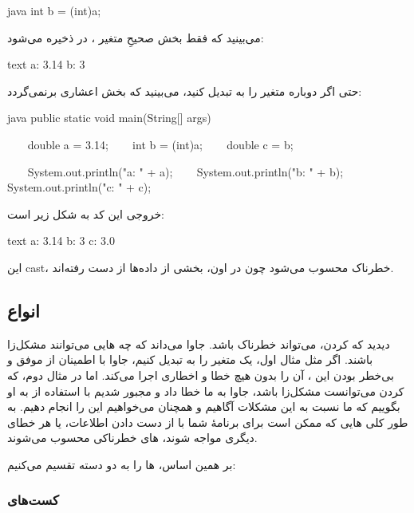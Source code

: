 \begin{codebox}{java}
int b = (int)a;
\end{codebox}

می‌بینید که فقط بخش صحیحِ متغیر ، در  ذخیره
می‌شود:

\begin{codebox}{text}
a: 3.14  
b: 3
\end{codebox}

حتی اگر دوباره متغیر  را به  تبدیل
کنید، می‌بینید که بخش اعشاری‌ برنمی‌گردد:

\begin{codebox}{java}
public static void main(String[] args) {
    double a = 3.14;
    int b = (int)a;
    double c = b;  
  
    System.out.println("a: " + a);  
    System.out.println("b: " + b);  
    System.out.println("c: " + c);  
}
\end{codebox}

خروجی این کد به شکل زیر است:

\begin{codebox}{text}
a: 3.14  
b: 3  
c: 3.0
\end{codebox}

این cast، خطرناک محسوب می‌شود چون در اون، بخشی از داده‌ها از دست رفته‌اند.

\subsection{انواع }

دیدید که  کردن، می‌تواند خطرناک باشد. جاوا می‌داند که چه
 هایی می‌توانند مشکل‌زا باشند. اگر مثل مثال اول، یک متغیر
 را به  تبدیل کنیم، جاوا با اطمینان
از موفق و بی‌خطر بودن این  ، آن را بدون هیچ خطا و اخطاری اجرا
می‌کند. اما در مثال دوم، که  کردن می‌توانست مشکل‌زا باشد، جاوا به
ما خطا داد و مجبور شدیم با استفاده از  به او بگوییم
که ما نسبت به این مشکلات آگاهیم و همچنان می‌خواهیم این  را انجام
دهیم. به طور کلی  هایی که ممکن است برای برنامهٔ شما با از دست
دادن اطلاعات،  یا هر خطای دیگری مواجه شوند،  های
خطرناکی محسوب می‌شوند.

بر همین اساس،  ها را به دو دسته تقسیم می‌کنیم:

\subsubsection{کست‌های }

